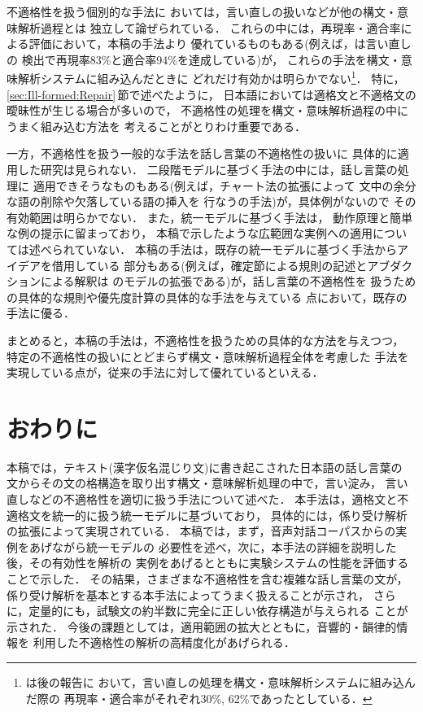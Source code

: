 不適格性を扱う個別的な手法\cite{Hindle:ACL83-123,Bear:ACL92-56,
Nakatani:ACL93-46,佐川:情処論-35-1-46,山本:情処論-33-11-1322}に
おいては，言い直しの扱いなどが他の構文・意味解析過程とは
独立して論ぜられている．
これらの中には，再現率・適合率による評価において，本稿の手法より
優れているものもある(例えば，は言い直しの
検出で再現率83\%と適合率94\%を達成している)が，
これらの手法を構文・意味解析システムに組み込んだときに
どれだけ有効かは明らかでない\footnote{
  \citeauthor{Bear:ACL92-56}は後の報告\cite{Dowding:ACL93-54}に
おいて，言い直しの処理を構文・意味解析システムに組み込んだ際の
再現率・適合率がそれぞれ30\%, 62\%であったとしている．
}．
特に，\ref{sec:Ill-formed:Repair}\,節で述べたように，
日本語においては適格文と不適格文の曖昧性が生じる場合が多いので，
不適格性の処理を構文・意味解析過程の中にうまく組み込む方法を
考えることがとりわけ重要である．

一方，不適格性を扱う一般的な手法を話し言葉の不適格性の扱いに
具体的に適用した研究は見られない．
二段階モデルに基づく手法\cite{Jensen:CL-9-3-147,McDonald:ANLP92-193,
Weischedel:CL-9-3-161,Mellish:ACL89-102}の中には，話し言葉の処理に
適用できそうなものもある(例えば，チャート法の拡張によって
文中の余分な語の削除や欠落している語の挿入を
行なうの手法)が，具体例がないので
その有効範囲は明らかでない．
また，統一モデルに基づく手法\cite{Fass:CL-9-3-178,Hobbs:AI-63-69}は，
動作原理と簡単な例の提示に留まっており，
本稿で示したような広範囲な実例への適用については述べられていない．
本稿の手法は，既存の統一モデルに基づく手法からアイデアを借用している
部分もある(例えば，確定節による規則の記述とアブダクションによる解釈は
のモデルの拡張である)が，話し言葉の不適格性を
扱うための具体的な規則や優先度計算の具体的な手法を与えている
点において，既存の手法に優る．

まとめると，本稿の手法は，不適格性を扱うための具体的な方法を与えつつ，
特定の不適格性の扱いにとどまらず構文・意味解析過程全体を考慮した
手法を実現している点が，従来の手法に対して優れているといえる．
\section{おわりに}\label{sec:Conclude}

本稿では，テキスト(漢字仮名混じり文)に書き起こされた日本語の話し言葉の
文からその文の格構造を取り出す構文・意味解析処理の中で，言い淀み，
言い直しなどの不適格性を適切に扱う手法について述べた．
本手法は，適格文と不適格文を統一的に扱う統一モデルに基づいており，
具体的には，係り受け解析の拡張によって実現されている．
本稿では，まず，音声対話コーパスからの実例をあげながら統一モデルの
必要性を述べ，次に，本手法の詳細を説明した後，その有効性を解析の
実例をあげるとともに実験システムの性能を評価することで示した．
その結果，さまざまな不適格性を含む複雑な話し言葉の文が，
係り受け解析を基本とする本手法によってうまく扱えることが示され，
さらに，定量的にも，試験文の約半数に完全に正しい依存構造が与えられる
ことが示された．
今後の課題としては，適用範囲の拡大とともに，音響的・韻律的情報を
利用した不適格性の解析の高精度化があげられる．




